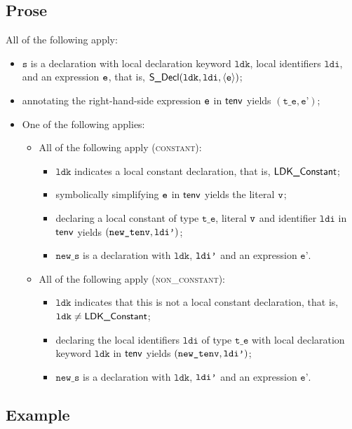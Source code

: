 \documentclass{book}
\newcommand\ProseOrTypeError[0]{\ProseTerminateAs{\TypeErrorConfig}}
\newcommand\newtenv[0]{\texttt{new\_tenv}}
\newcommand\vte[0]{\texttt{t\_e}}
\newcommand\vs[0]{\texttt{s}}
\newcommand\ldi[0]{\texttt{ldi}}
\newcommand\ldk[0]{\texttt{ldk}}
\newcommand\news[0]{\texttt{new\_s}}
\newcommand\vep[0]{\texttt{e'}}
\begin{document}
\subsection{Prose}
All of the following apply:
\begin{itemize}
  \item $\vs$ is a declaration with local declaration keyword $\ldk$, local identifiers $\ldi$, and an expression $\texttt{e}$,
        that is, $\SDecl(\ldk, \ldi, \langle\ve\rangle)$;
  \item annotating the right-hand-side expression $\texttt{e}$ in $\textsf{tenv}$ yields $(\vte,\vep)$\ProseOrTypeError;
  \item One of the following applies:
  \begin{itemize}
    \item All of the following apply (\textsc{constant}):
    \begin{itemize}
      \item $\ldk$ indicates a local constant declaration, that is, $\textsf{LDK\_Constant}$;
      \item symbolically simplifying $\texttt{e}$ in $\textsf{tenv}$ yields the literal $\texttt{v}$\ProseOrTypeError;
      \item declaring a local constant of type $\vte$, literal $\texttt{v}$ and identifier $\ldi$ in $\textsf{tenv}$ yields $(\newtenv, \ldip)$;
      \item $\news$ is a declaration with $\ldk$, $\texttt{ldi'}$ and an expression $\vep$.
    \end{itemize}

    \item All of the following apply (\textsc{non\_constant}):
    \begin{itemize}
      \item $\ldk$ indicates that this is not a local constant declaration, that is, $\ldk\neq\LDKConstant$;
      \item declaring the local identifiers $\ldi$ of type $\vte$ with local declaration keyword $\ldk$ in $\textsf{tenv}$
            yields $(\newtenv, \ldip)$;
      \item $\news$ is a declaration with $\ldk$, $\texttt{ldi'}$ and an expression $\vep$.
    \end{itemize}
  \end{itemize}
\end{itemize}

\subsection{Example}
\end{document}
